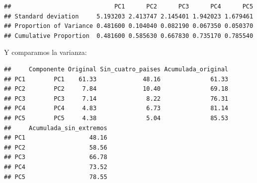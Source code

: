 \documentclass[
]{article}
\newenvironment{Shaded}{\begin{snugshade}}{\end{snugshade}}
\newcommand{\AttributeTok}[1]{\textcolor[rgb]{0.13,0.29,0.53}{#1}}
\newcommand{\CommentTok}[1]{\textcolor[rgb]{0.56,0.35,0.01}{\textit{#1}}}
\newcommand{\DecValTok}[1]{\textcolor[rgb]{0.00,0.00,0.81}{#1}}
\newcommand{\FunctionTok}[1]{\textcolor[rgb]{0.13,0.29,0.53}{\textbf{#1}}}
\newcommand{\NormalTok}[1]{#1}
\newcommand{\OtherTok}[1]{\textcolor[rgb]{0.56,0.35,0.01}{#1}}
\newcommand{\SpecialCharTok}[1]{\textcolor[rgb]{0.81,0.36,0.00}{\textbf{#1}}}
\newcommand{\StringTok}[1]{\textcolor[rgb]{0.31,0.60,0.02}{#1}}
\begin{document}
\begin{verbatim}
##                             PC1      PC2      PC3      PC4      PC5
## Standard deviation     5.193203 2.413747 2.145401 1.942023 1.679461
## Proportion of Variance 0.481600 0.104040 0.082190 0.067350 0.050370
## Cumulative Proportion  0.481600 0.585630 0.667830 0.735170 0.785540
\end{verbatim}

Y comparamos la varianza:

\begin{Shaded}
\end{Shaded}

\begin{verbatim}
##     Componente Original Sin_cuatro_paises Acumulada_original
## PC1        PC1    61.33             48.16              61.33
## PC2        PC2     7.84             10.40              69.18
## PC3        PC3     7.14              8.22              76.31
## PC4        PC4     4.83              6.73              81.14
## PC5        PC5     4.38              5.04              85.53
##     Acumulada_sin_extremos
## PC1                  48.16
## PC2                  58.56
## PC3                  66.78
## PC4                  73.52
## PC5                  78.55
\end{verbatim}
\end{document}
